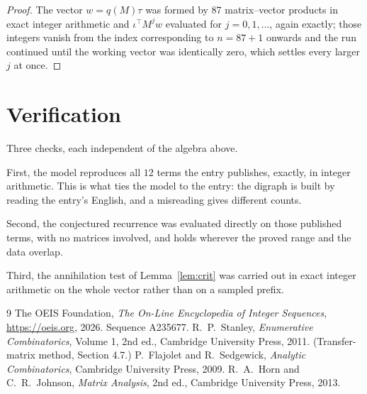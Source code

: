 \documentclass[11pt,a4paper]{article}
\theoremstyle{plain}
\theoremstyle{definition}
\begin{document}
\begin{proof}
The vector $w=q(M)\tau$ was formed by $87$ matrix--vector products in exact integer
arithmetic and $\iota^{\!\top}M^{j}w$ evaluated for $j=0,1,\dots$, again exactly; those
integers vanish from the index corresponding to $n=87+1$ onwards and the run continued
until the working vector was identically zero, which settles every larger $j$ at once.
\end{proof}

\section{Verification}

Three checks, each independent of the algebra above.

First, the model reproduces all $12$ terms the entry publishes, exactly, in integer
arithmetic. This is what ties the model to the entry: the digraph is built by reading the
entry's English, and a misreading gives different counts.

Second, the conjectured recurrence was evaluated directly on those published terms, with no
matrices involved, and holds wherever the proved range and the data overlap.

Third, the annihilation test of Lemma~\ref{lem:crit} was carried out in exact integer
arithmetic on the whole vector rather than on a sampled prefix.

\begin{thebibliography}{9}
 The OEIS Foundation, \emph{The On-Line Encyclopedia of Integer
Sequences}, \url{https://oeis.org}, 2026. Sequence A235677.
 R.~P.~Stanley, \emph{Enumerative Combinatorics}, Volume 1, 2nd ed.,
Cambridge University Press, 2011. (Transfer-matrix method, Section 4.7.)
 P.~Flajolet and R.~Sedgewick, \emph{Analytic Combinatorics}, Cambridge
University Press, 2009.
 R.~A.~Horn and C.~R.~Johnson, \emph{Matrix Analysis}, 2nd ed., Cambridge
University Press, 2013.
\end{thebibliography}
\end{document}

